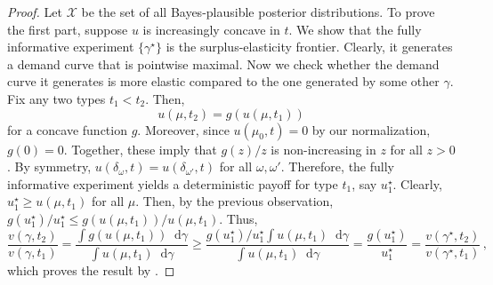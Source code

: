 \documentclass[12pt,letterpaper]{article}
\newenvironment{original}{\color{black}\noindent}{}
\theoremstyle{plain}
\theoremstyle{definition}
\theoremstyle{remark}
\renewcommand{\1}{\mathds{1}}
\renewcommand*\d{\mathop{}\!\mathrm{d}}
\newcommand{\X}{\mathcal{X}}
\theoremstyle{definition}
\begin{document}
\begin{proof}
\begin{original}
Let $\X$ be the set of all Bayes-plausible posterior distributions. To prove the first part, suppose $u$ is increasingly concave in $t$. We show that the fully informative experiment $\{\gamma^\star\}$ is the surplus-elasticity frontier. Clearly, it generates a demand curve that is pointwise maximal. Now we check whether the demand curve it generates is more elastic compared to the one generated by some other $\gamma$.  Fix any two types $t_1 < t_2$. Then,
\[u(\mu, t_2) = g(u(\mu, t_1))\]
for a concave function $g$. Moreover, since $u(\mu_0, t) = 0$ by our normalization, $g(0) = 0$. Together, these imply that $g(z)/z$ is non-increasing in $z$ for all $z > 0$.  By symmetry, $u(\delta_\omega, t) = u(\delta_{\omega'}, t)$ for all $\omega, \omega'$. Therefore, the fully informative experiment yields a deterministic payoff for type $t_1$, say $u^\star_1$. Clearly, $u^\star_1 \geq u(\mu, t_1)$ for all $\mu$. Then, by the previous observation, $g(u^\star_1) / u^{\star}_1 \leq g(u(\mu, t_1))/ u(\mu, t_1)$. Thus,
\[\frac{v(\gamma, t_2)}{v(\gamma, t_1)} =  \frac{\int g(u(\mu, t_1)) \d \gamma }{\int u(\mu, t_1) \d \gamma}  \geq  \frac{g(u^\star_1) /u^\star_1 \int u(\mu, t_1) \d \gamma }{\int u(\mu, t_1) \d \gamma} = \frac{g(u^\star_1)}{u^\star_1} = \frac{v(\gamma^\star, t_2)}{v(\gamma^\star, t_1)}\,,\]
which proves the result by .


\end{original}
\end{proof}
\end{document}
